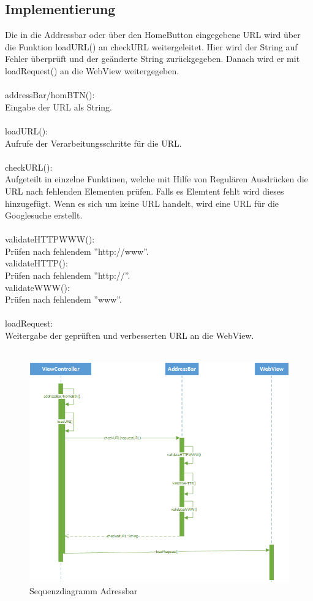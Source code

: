 \subsection{Implementierung}
Die in die Addressbar oder über den HomeButton eingegebene URL wird über die Funktion loadURL() an checkURL weitergeleitet.
Hier wird der String auf Fehler überprüft und der geänderte String zurückgegeben. Danach wird er mit loadRequest() an die
WebView weitergegeben.
\\\\
addressBar/homBTN():\\
Eingabe der URL als String.
\\\\
loadURL():\\
Aufrufe der Verarbeitungsschritte für die URL.
\\\\
checkURL():\\
Aufgeteilt in einzelne Funktinen, welche mit Hilfe von Regulären Ausdrücken die URL nach fehlenden Elementen prüfen.
Falls es Elemtent fehlt wird dieses hinzugefügt. Wenn es sich um keine URL handelt, wird eine URL für die Googlesuche erstellt.
\\\\
validateHTTPWWW():\\
Prüfen nach fehlendem ''http://www''.
\\
validateHTTP():\\
Prüfen nach fehlendem ''http://''.
\\
validateWWW():\\
Prüfen nach fehlendem ''www''.
\\\\
loadRequest:\\
Weitergabe der geprüften und verbesserten URL an die WebView.
\\\\
\begin{figure}
	\includegraphics[width=\textwidth]{Pics/AddressCheck.png} 
	\caption{Sequenzdiagramm Adressbar}
	\label{fig:bild}
\end{figure}